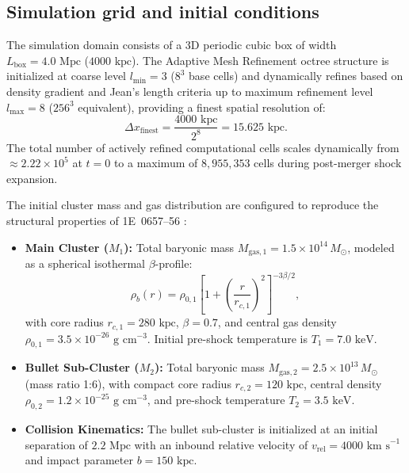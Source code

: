 \documentclass[aps,prd,reprint,superscriptaddress,nofootinbib,floatfix,amsmath,amssymb]{revtex4-2}
\begin{document}
\subsection{Simulation grid and initial conditions}

The simulation domain consists of a 3D periodic cubic box of width $L_{\text{box}} = 4.0\text{ Mpc}$ ($4000\text{ kpc}$). The Adaptive Mesh Refinement octree structure is initialized at coarse level $l_{\text{min}} = 3$ ($8^3$ base cells) and dynamically refines based on density gradient and Jean's length criteria up to maximum refinement level $l_{\text{max}} = 8$ ($256^3$ equivalent), providing a finest spatial resolution of:
\begin{equation}
\Delta x_{\text{finest}} = \frac{4000\text{ kpc}}{2^8} = 15.625\text{ kpc}.
\end{equation}
The total number of actively refined computational cells scales dynamically from $\approx 2.22 \times 10^5$ at $t = 0$ to a maximum of $8{,}955{,}353$ cells during post-merger shock expansion.

The initial cluster mass and gas distribution are configured to reproduce the structural properties of 1E~0657--56 \cite{Markevitch2004_Bullet,Bradac2006_Bullet}:
\begin{itemize}
    \item \textbf{Main Cluster ($M_1$):} Total baryonic mass $M_{\text{gas}, 1} = 1.5 \times 10^{14}\,M_\odot$, modeled as a spherical isothermal $\beta$-profile:
    \begin{equation}
    \rho_b(r) = \rho_{0, 1} \left[ 1 + \left(\frac{r}{r_{c, 1}}\right)^2 \right]^{-3\beta/2},
    \end{equation}
    with core radius $r_{c, 1} = 280\text{ kpc}$, $\beta = 0.7$, and central gas density $\rho_{0, 1} = 3.5 \times 10^{-26}\text{ g cm}^{-3}$. Initial pre-shock temperature is $T_1 = 7.0\text{ keV}$.
    \item \textbf{Bullet Sub-Cluster ($M_2$):} Total baryonic mass $M_{\text{gas}, 2} = 2.5 \times 10^{13}\,M_\odot$ (mass ratio 1:6), with compact core radius $r_{c, 2} = 120\text{ kpc}$, central density $\rho_{0, 2} = 1.2 \times 10^{-25}\text{ g cm}^{-3}$, and pre-shock temperature $T_2 = 3.5\text{ keV}$.
    \item \textbf{Collision Kinematics:} The bullet sub-cluster is initialized at an initial separation of $2.2\text{ Mpc}$ with an inbound relative velocity of $v_{\text{rel}} = 4000\text{ km s}^{-1}$ and impact parameter $b = 150\text{ kpc}$.
\end{itemize}
\end{document}
